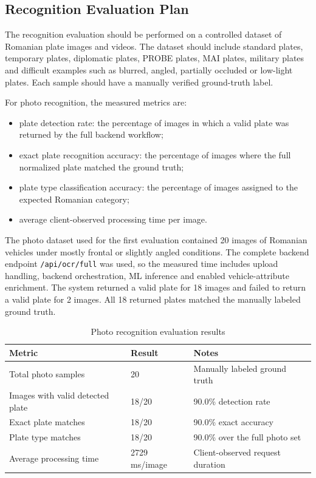 ﻿\documentclass[12pt,a4paper]{article}
\begin{document}
\subsection{Recognition Evaluation Plan}

The recognition evaluation should be performed on a controlled dataset of Romanian plate images and videos. The dataset should include standard plates, temporary plates, diplomatic plates, PROBE plates, MAI plates, military plates and difficult examples such as blurred, angled, partially occluded or low-light plates. Each sample should have a manually verified ground-truth label.

For photo recognition, the measured metrics are:

\begin{itemize}
    \item plate detection rate: the percentage of images in which a valid plate was returned by the full backend workflow;
    \item exact plate recognition accuracy: the percentage of images where the full normalized plate matched the ground truth;
    \item plate type classification accuracy: the percentage of images assigned to the expected Romanian category;
    \item average client-observed processing time per image.
\end{itemize}

The photo dataset used for the first evaluation contained 20 images of Romanian vehicles under mostly frontal or slightly angled conditions. The complete backend endpoint \texttt{/api/ocr/full} was used, so the measured time includes upload handling, backend orchestration, ML inference and enabled vehicle-attribute enrichment. The system returned a valid plate for 18 images and failed to return a valid plate for 2 images. All 18 returned plates matched the manually labeled ground truth.

\begin{table}[H]
\centering
\begin{tabular}{|p{6cm}|p{4cm}|p{4cm}|}
\hline
\textbf{Metric} & \textbf{Result} & \textbf{Notes} \\
\hline
Total photo samples & 20 & Manually labeled ground truth \\
\hline
Images with valid detected plate & 18/20 & 90.0\% detection rate \\
\hline
Exact plate matches & 18/20 & 90.0\% exact accuracy \\
\hline
Plate type matches & 18/20 & 90.0\% over the full photo set \\
\hline
Average processing time & 2729 ms/image & Client-observed request duration \\
\hline
\end{tabular}
\caption{Photo recognition evaluation results}
\end{table}
\end{document}
